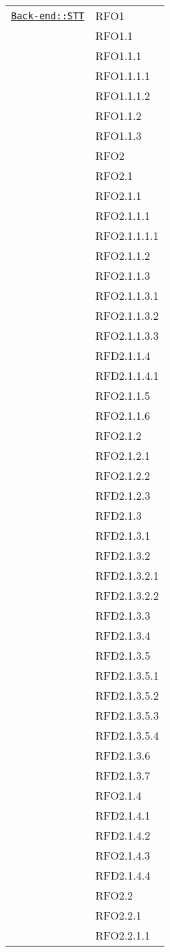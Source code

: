 \begin{longtable}{|>{\centering}m{10cm}|m{3cm}<{\centering}|}
\hyperref[Back-end::STT]{\texttt{Back-end::STT}} & RFO1\\
& RFO1.1\\
& RFO1.1.1\\
& RFO1.1.1.1\\
& RFO1.1.1.2\\
& RFO1.1.2\\
& RFO1.1.3\\
& RFO2\\
& RFO2.1\\
& RFO2.1.1\\
& RFO2.1.1.1\\
& RFO2.1.1.1.1\\
& RFO2.1.1.2\\
& RFO2.1.1.3\\
& RFO2.1.1.3.1\\
& RFO2.1.1.3.2\\
& RFO2.1.1.3.3\\
& RFD2.1.1.4\\
& RFD2.1.1.4.1\\
& RFO2.1.1.5\\
& RFO2.1.1.6\\
& RFO2.1.2\\
& RFO2.1.2.1\\
& RFO2.1.2.2\\
& RFD2.1.2.3\\
& RFD2.1.3\\
& RFD2.1.3.1\\
& RFD2.1.3.2\\
& RFD2.1.3.2.1\\
& RFD2.1.3.2.2\\
& RFD2.1.3.3\\
& RFD2.1.3.4\\
& RFD2.1.3.5\\
& RFD2.1.3.5.1\\
& RFD2.1.3.5.2\\
& RFD2.1.3.5.3\\
& RFD2.1.3.5.4\\
& RFD2.1.3.6\\
& RFD2.1.3.7\\
& RFO2.1.4\\
& RFD2.1.4.1\\
& RFD2.1.4.2\\
& RFO2.1.4.3\\
& RFD2.1.4.4\\
& RFO2.2\\
& RFO2.2.1\\
& RFO2.2.1.1\\

\end{longtable}
